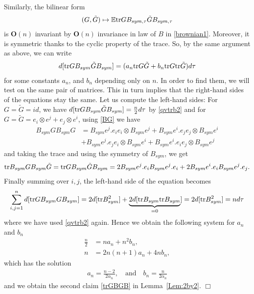 \documentclass[english, letterpaper,12pt,reqno]{amsart}
\theoremstyle{remark}
\renewenvironment{proof}[1][Proof]{ {\itshape \noindent {#1.}} }{$\Box$
\medskip}
\theoremstyle{plain}
\newcommand{\1}{\mathbf{1}}
\def\bbE{\mathbb E}
\def\tr{{\rm tr}}
\begin{document}
\begin{proof}[Proof of Lemma~\ref{lem:quadraticvar}]
\medskip \noindent
Similarly, the bilinear form 
%
\begin{align*}
    (G,\tilde G) \mapsto \bbE \tr GB_{sym,\tau}\tilde G B_{sym,\tau}
\end{align*}
%
is $\textbf{O}(n)$ invariant by $\textbf{O}(n)$ invariance in law of $B$ in \ref{brownian1}. Moreover, it is symmetric thanks to the cyclic property of the trace.
So, by the same argument as above, we can write 
%
\begin{align*}
  d[ \tr GB_{sym} \tilde GB_{sym}] =(a_{n} \tr G \tilde G+b_{n} \tr G\tr\tilde G) d\tau
\end{align*}
%
for some constants $a_n$, and $b_n$ depending only on $n$. In order to find them, we will test on the same pair of matrices. This in turn implies that the right-hand sides of the equations stay the same. Let us compute the left-hand sides: For $G=\tilde G=id$, we have $d[\tr GB_{sym}\tilde G B_{sym}] =\frac{n}{2}d\tau$ by \eqref{qvtrb2} and for $G=\tilde G =e_i\otimes e^j +e_j\otimes e^i$, using \eqref{BG} we have 
%
\begin{align*}
    B_{sym}GB_{sym}G&=B_{sym} e^j . e_i e_i\otimes B_{sym}e^j+ B_{sym} e^i . e_j e_j\otimes B_{sym}e^i\\ & +B_{sym} e^j . e_j e_i\otimes B_{sym}e^i+B_{sym} e^i . e_i e_j\otimes B_{sym}e^j
\end{align*}
%
and taking the trace and using the symmetry of $B_{sym}$, we get
%
\begin{align*}
     \tr B_{sym}GB_{sym}\tilde G= \tr GB_{sym}\tilde G B_{sym} =2B_{sym}e^j. e_iB_{sym} e^j. e_i+2B_{sym}e^i. e_iB_{sym} e^j. e_j.
\end{align*}
%
Finally summing over $i,j$, the left-hand side of the equation becomes 
%
\begin{align*}
    \sum_{i,j=1}^n d[\tr G B_{sym}G B_{sym}]=2d[\tr B_{sym}^2]+\underbrace{2d[\tr B_{sym}\tr B_{sym}}_{=0}]=2d[\tr B_{sym}^2]=nd\tau
\end{align*}
%
where we have used \eqref{qvtrb2} again. Hence we obtain the following system for $a_n$ and $b_n$
%
\begin{align*}
 \frac{n}{2}&=  na_{n}+n^2 b_{n},\\
n&=2n(n+1)a_{n}+4n b_{n},
    \end{align*}
 which has the solution 
 \begin{align*}
     a_{n}=\frac{n-2}{2\alpha_n}, \quad \text{and} \quad b_{n}=\frac{n}{2\alpha_n}
 \end{align*}   
 and we obtain the second claim \eqref{trGBGB} in Lemma~\ref{Lem:2by2}.
\hfill\end{proof}
%
\end{document}
